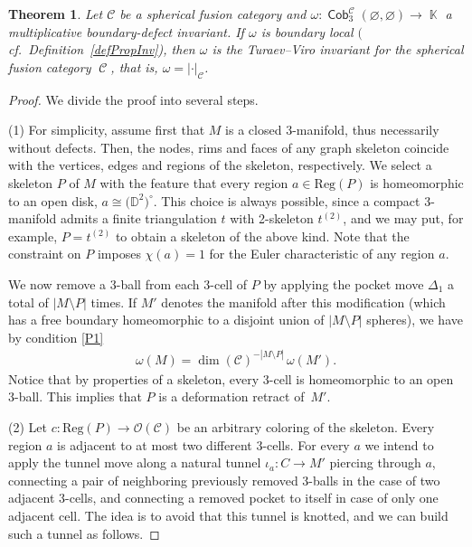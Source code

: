 \documentclass[pdftex]{sigma}
\DeclareMathOperator{\K}{\mathbb{K}}
\DeclareMathOperator{\Cob}{\mathsf{Cob}}
\DeclareMathOperator{\calc}{\mathcal{C}}
\numberwithin{equation}{section}
\newtheorem{Theorem}{Theorem}[section]
\theoremstyle{definition}
\begin{document}
\begin{Theorem}
 \label{thmMain}
 Let $\mathcal{C}$ be a spherical fusion category and $\omega\colon \Cob_3^{\mathcal{C}}(\varnothing, \varnothing) \rightarrow \K$ a multiplicative boundary-defect invariant. If $\omega$ is boundary local $($cf.\ Definition~{\rm \ref{defPropInv})}, then $\omega$ is the Turaev--Viro invariant for the spherical fusion category $\calc$, that is, $\omega = | \cdot |_{\calc}$.
\end{Theorem}
\begin{proof}
 We divide the proof into several steps.

 (1) For simplicity, assume first that $M$ is a closed 3-manifold, thus necessarily without defects. Then, the nodes, rims and faces of any graph skeleton coincide with the vertices, edges and regions of the skeleton, respectively. We select a skeleton $P$ of $M$ with the feature that every region $a \in \mathrm{Reg}(P)$ is homeomorphic to an open disk, $a \cong \bigl(\mathbb{D}^2\bigr)^{\circ}$. This choice is always possible, since a compact 3-manifold admits a finite triangulation $t$ with 2-skeleton $t^{(2)}$, and we may put, for example, $P = t^{(2)}$ to obtain a skeleton of the above kind. Note that the constraint on $P$ imposes $\chi(a) = 1$ for the Euler characteristic of any region $a$.

 We now remove a 3-ball from each 3-cell of $P$ by applying the pocket move $\Delta_1$ a total of $|M\setminus P|$ times. If $M'$ denotes the manifold after this modification (which has a free boundary homeomorphic to a disjoint union of $|M\setminus P|$ spheres), we have by condition \ref{P1}
 \begin{align}
 \label{eqT1}
 \omega(M) = \dim(\mathcal{C})^{-|M\setminus P|} \, \omega(M').
 \end{align}
 Notice that by properties of a skeleton, every 3-cell is homeomorphic to an open 3-ball. This implies that $P$ is a deformation retract of~$M'$.

 (2) Let $c\colon \mathrm{Reg}(P) \rightarrow \mathcal{O}({\mathcal{C}})$ be an arbitrary coloring of the skeleton. Every region $a$ is adjacent to at most two different 3-cells. For every $a$ we intend to apply the tunnel move  along a natural tunnel $\iota_a\colon C \rightarrow M'$ piercing through $a$, connecting a pair of neighboring previously removed 3-balls in the case of two adjacent 3-cells, and connecting a removed pocket to itself in case of only one adjacent cell. The idea is to avoid that this tunnel is knotted, and we can build such a tunnel as follows.


\end{proof}
\end{document}
